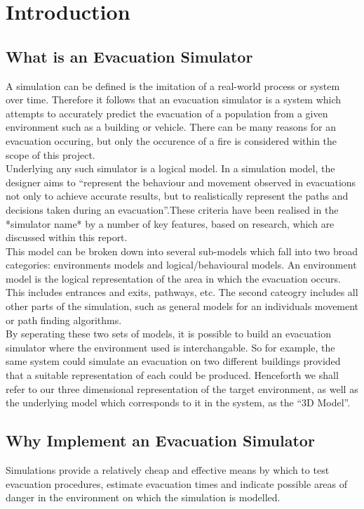 \documentclass{article}
\begin{document}
\section{Introduction}
\subsection{What is an Evacuation Simulator}
A simulation can be defined  is the imitation of a real-world process or system over time\cite{DiscreteEvent}. Therefore it follows that an evacuation simulator is a system which attempts to accurately predict the evacuation of a population from a given environment such as a building or vehicle. There can be many reasons for an evacuation occuring, but only the occurence of a fire is considered within the scope of this project.\\

Underlying any such simulator is a logical model. In a simulation model, the designer aims to ``represent the behaviour and movement observed in evacuations not only to achieve accurate results, but to realistically represent the paths  and decisions taken during an evacuation''\cite{MethodReview}.These criteria have been realised in the *simulator name* by a number of key features, based on research, which are discussed within this report.\\

This model can be broken down into several sub-models which fall into two broad categories: environments models and logical/behavioural models. An environment model is the logical representation of the area in which the evacuation occurs. This includes entrances and exits, pathways, etc. The second cateogry includes all other parts of the simulation, such as general models for an individuals movement or path finding algorithms. \\

By seperating these two sets of models, it is possible to build an evacuation simulator where the environment used is interchangable. So for example, the same system could simulate an evacuation on two different buildings provided that a suitable representation of each could be produced. 
Henceforth we shall refer to our three dimensional representation of the target environment, as well as the underlying model which corresponds to it in the system, as the ``3D Model''.\\

\subsection{Why Implement an Evacuation Simulator}
Simulations provide a relatively cheap and effective means by which to test evacuation procedures, estimate evacuation times and indicate possible areas of danger in the environment on which the simulation is modelled.\\
\end{document}
